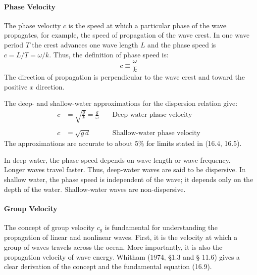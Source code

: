\paragraph{Phase Velocity}
The phase velocity
$c$ is the speed at which a particular phase of the wave propagates,
for example, the speed of propagation of the wave crest. In one wave
period $T$ the crest advances one wave length $L$ and the phase speed
is $c=L/T= \omega /k$. Thus, the definition of phase speed is:
   \begin{equation}
      c \equiv \frac {\omega}{k}
   \end{equation}
The direction of propagation is perpendicular to the wave crest and
toward the positive $x$ direction.

The deep- and shallow-water approximations for the dispersion relation
give:
  \begin{align}
   c &= \sqrt{\frac{g}{k}} = \frac{g}{\omega} & & \text{ Deep-water phase
velocity} \\
   & &  & \nonumber \\
   c &=\sqrt{g\,d} & & \text{ Shallow-water phase velocity}
  \end{align}
The approximations are accurate to about 5\% for limits stated in (16.4, 16.5).

In deep water, the phase speed depends on wave length or wave
frequency. Longer waves travel faster. Thus, deep-water waves are said
to be dispersive. In shallow water, the phase speed is independent of
the wave; it depends only on the depth of the water. Shallow-water
waves are non-dispersive.

\paragraph{Group Velocity}
The concept of group
velocity $c_{g}$ is fundamental for understanding the propagation of
linear and nonlinear waves. First, it is the velocity at which a group
of waves travels across the ocean. More importantly, it is also the
propagation velocity of wave energy. Whitham (1974, \S 1.3 and \S
11.6) gives a clear derivation of the concept and the fundamental
equation (16.9).

